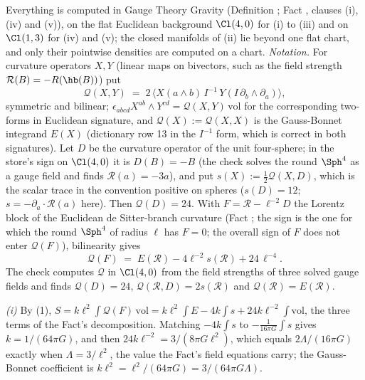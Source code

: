 Everything is computed in Gauge Theory Gravity (Definition ; Fact , clauses (i), (iv) and (v)), on the flat Euclidean background $\Cl(4,0)$ for (i) to (iii) and on $\Cl(1,3)$ for (iv) and (v); the closed manifolds of (ii) lie beyond one flat chart, and only their pointwise densities are computed on a chart. \emph{Notation.} For curvature operators $X, Y$ (linear maps on bivectors, such as the field strength $\mathcal{R}(B) = -R(\hb(B))$) put
\[
\mathcal{Q}(X, Y) \;=\; 2\,\langle X(a\wedge b)\,I^{-1}\,Y(I\,\partial_{b}\wedge\partial_{a})\rangle ,
\]
symmetric and bilinear; $\epsilon_{abcd}X^{ab}\wedge Y^{cd} = \mathcal{Q}(X, Y)\,\mathrm{vol}$ for the corresponding two-forms in Euclidean signature, and $\mathcal{Q}(X) := \mathcal{Q}(X, X)$ is the Gauss-Bonnet integrand $E(X)$ (dictionary row 13 in the $I^{-1}$ form, which is correct in both signatures). Let $D$ be the curvature operator of the unit four-sphere; in the store's sign on $\Cl(4,0)$ it is $D(B) = -B$ (the check solves the round $\Sph^{4}$ as a gauge field and finds $\mathcal{R}(a) = -3a$), and put $s(X) := \tfrac12\mathcal{Q}(X, D)$, which is the scalar trace in the convention positive on spheres ($s(D) = 12$; $s = -\partial_{a}\cdot\mathcal{R}(a)$ here). Then $\mathcal{Q}(D) = 24$. With $F = \mathcal{R} - \ell^{-2}D$ the Lorentz block of the Euclidean de Sitter-branch curvature (Fact ; the sign is the one for which the round $\Sph^{4}$ of radius $\ell$ has $F = 0$; the overall sign of $F$ does not enter $\mathcal{Q}(F)$), bilinearity gives
\begin{equation}
\mathcal{Q}(F) \;=\; E(\mathcal{R}) - 4\ell^{-2}s(\mathcal{R}) + 24\,\ell^{-4}. \tag{1}
\end{equation}
The check computes $\mathcal{Q}$ in $\Cl(4,0)$ from the field strengths of three solved gauge fields and finds $\mathcal{Q}(D) = 24$, $\mathcal{Q}(\mathcal{R}, D) = 2s(\mathcal{R})$ and $\mathcal{Q}(\mathcal{R}) = E(\mathcal{R})$.

\emph{(i)} By (1), $S = k\ell^{2}\int\mathcal{Q}(F)\,\mathrm{vol} = k\ell^{2}\int E - 4k\int s + 24k\ell^{-2}\int\mathrm{vol}$, the three terms of the Fact's decomposition. Matching $-4k\int s$ to $-\tfrac{1}{16\pi G}\int s$ gives $k = 1/(64\pi G)$, and then $24k\ell^{-2} = 3/(8\pi G\ell^{2})$, which equals $2\Lambda/(16\pi G)$ exactly when $\Lambda = 3/\ell^{2}$, the value the Fact's field equations carry; the Gauss-Bonnet coefficient is $k\ell^{2} = \ell^{2}/(64\pi G) = 3/(64\pi G\Lambda)$.

